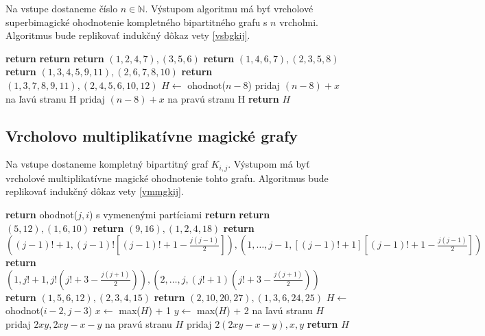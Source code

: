 \begin{alg}
\label{algvsbgkij}
Na vstupe dostaneme číslo $n \in \mathbb{N}$. Výstupom algoritmu má byť vrcholové superbimagické ohodnotenie kompletného bipartitného grafu s $n$ vrcholmi. Algoritmus bude replikovať indukčný dôkaz vety \ref{vsbgkij}.
\end{alg}

\begin{algorithmic}
	\STATE \textbf{return}
\ENDIF
{}
	\STATE \textbf{return}
\ENDIF
{}
	\STATE \textbf{return} $(1, 2, 4, 7), (3, 5, 6)$
\ENDIF
{}
	\STATE \textbf{return} $(1, 4, 6, 7), (2, 3, 5, 8)$
\ENDIF
{}
	\STATE \textbf{return} $(1, 3, 4, 5, 9, 11), (2, 6, 7, 8, 10)$
\ENDIF
{}
	\STATE \textbf{return} $(1, 3, 7, 8, 9, 11), (2, 4, 5, 6, 10, 12)$
\ENDIF
\STATE $H \gets$ ohodnot($n - 8$)
		\STATE pridaj $(n-8)+x$ na ľavú stranu H
	\ELSE
		\STATE pridaj $(n-8)+x$ na pravú stranu H
	\ENDIF
\ENDFOR
\STATE \textbf{return} $H$
\end{algorithmic}

\subsection{Vrcholovo multiplikatívne magické grafy}

\begin{alg}
\label{algvmmgkij}
Na vstupe dostaneme kompletný bipartitný graf $K_{i,j}$. Výstupom má byť vrcholové multiplikatívne magické ohodnotenie tohto grafu. Algoritmus bude replikovať indukčný dôkaz vety \ref{vmmgkij}.
\end{alg}

\begin{algorithmic}
	\STATE \textbf{return} ohodnot($j,i$) s vymenenými partíciami
\ENDIF
{}
	\STATE \textbf{return}
\ENDIF
{}
	\STATE \textbf{return} $(5, 12), (1, 6, 10)$
\ENDIF
{}
	\STATE \textbf{return} $(9, 16), (1, 2, 4, 18)$
\ENDIF
{}
	\STATE \textbf{return} $((j-1)! + 1, (j-1)! [(j-1)! + 1 - \frac{j(j-1)}{2}] ), (1, \dots , j-1, [(j-1)! + 1] [(j-1)! + 1 - \frac{j(j-1)}{2}] )$
\ENDIF
{}
	\STATE \textbf{return} $(1, j! + 1, j! (j! + 3 - \frac{j(j+1)}{2}) ), (2, \dots , j, (j! + 1) (j! + 3 - \frac{j(j+1)}{2}))$
\ENDIF
{}
	\STATE \textbf{return} $(1, 5, 6, 12), (2, 3, 4, 15)$
\ENDIF
{}
	\STATE \textbf{return} $(2, 10, 20, 27), (1, 3, 6, 24, 25)$
\ENDIF
\STATE $H \gets$ ohodnot($i - 2, j - 3$)
\STATE $x \gets$ max($H$) + 1
\STATE $y \gets$ max($H$) + 2
\STATE na ľavú stranu $H$ pridaj $2xy, 2xy - x - y$
\STATE na pravú stranu $H$ pridaj $2(2xy - x - y), x, y$
\STATE \textbf{return} $H$
\end{algorithmic}

